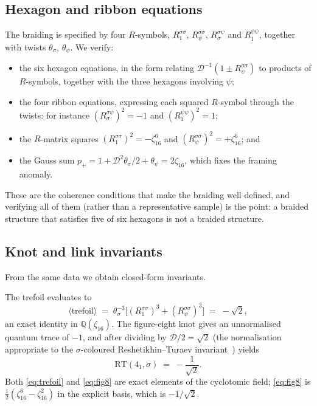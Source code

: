 \documentclass[aps,prx,nofootinbib,superscriptaddress,12pt]{revtex4-2}
\begin{document}
\subsection{Hexagon and ribbon equations}

The braiding is specified by four $R$-symbols, $R^{\sigma\sigma}_{1}$,
$R^{\sigma\sigma}_{\psi}$, $R^{\sigma\psi}_{\sigma}$ and
$R^{\psi\psi}_{1}$, together with twists $\theta_\sigma$, $\theta_\psi$.
We verify:
\begin{itemize}
\item the six hexagon equations, in the form relating
  $\mathcal{D}^{-1}(1 \pm R^{\sigma\sigma}_\psi)$ to products of
  $R$-symbols, together with the three hexagons involving $\psi$;
\item the four ribbon equations, expressing each squared $R$-symbol
  through the twists: for instance
  $(R^{\sigma\psi}_\sigma)^2 = -1$ and $(R^{\psi\psi}_1)^2 = 1$;
\item the $R$-matrix squares
  $(R^{\sigma\sigma}_1)^2 = -\zeta_{16}^6$ and
  $(R^{\sigma\sigma}_\psi)^2 = +\zeta_{16}^6$; and
\item the Gauss sum $p_+ = 1 + \mathcal{D}^2\theta_\sigma/2 + \theta_\psi
  = 2\zeta_{16}$, which fixes the framing anomaly.
\end{itemize}
These are the coherence conditions that make the braiding well defined,
and verifying all of them (rather than a representative sample) is
the point: a braided structure that satisfies five of six hexagons is not
a braided structure.

\subsection{Knot and link invariants}

From the same data we obtain closed-form invariants.

The trefoil evaluates to
\begin{equation}
\bigl\langle \mathrm{trefoil} \bigr\rangle
 \;=\; \theta_\sigma^{-3}\bigl[(R^{\sigma\sigma}_1)^3 + (R^{\sigma\sigma}_\psi)^3\bigr]
 \;=\; -\sqrt2 ,
\label{eq:trefoil}
\end{equation}
an exact identity in $\mathbb{Q}(\zeta_{16})$. The figure-eight knot
gives an unnormalised quantum trace of $-1$, and after dividing by
$\mathcal{D}/2 = \sqrt2$ (the normalisation appropriate to the
$\sigma$-coloured Reshetikhin--Turaev
invariant~\cite{ReshetikhinTuraev1991,Witten1989}) yields
\begin{equation}
\mathrm{RT}(4_1, \sigma) \;=\; -\frac{1}{\sqrt2} .
\label{eq:fig8}
\end{equation}
Both \eqref{eq:trefoil} and \eqref{eq:fig8} are exact elements of the
cyclotomic field; \eqref{eq:fig8} is
$\tfrac12(\zeta_{16}^6 - \zeta_{16}^2)$ in the explicit basis, which is
$-1/\sqrt2$.
\end{document}
